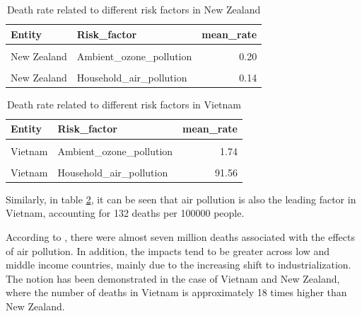 \documentclass[11pt,a4paper,]{article}
\begin{document}
\begin{table}[!h]

\caption{\label{tab:nz}Death rate related to different risk factors in New Zealand}
\centering
\begin{tabular}[t]{llr}
\toprule
Entity & Risk\_factor & mean\_rate\\
\midrule
\cellcolor{gray!6}{New Zealand} & \cellcolor{gray!6}{Air\_pollution} & \cellcolor{gray!6}{7.11}\\
New Zealand & Ambient\_ozone\_pollution & 0.20\\
\cellcolor{gray!6}{New Zealand} & \cellcolor{gray!6}{Ambient\_particulate\_matter\_pollution} & \cellcolor{gray!6}{6.77}\\
New Zealand & Household\_air\_pollution & 0.14\\
\bottomrule
\end{tabular}
\end{table}

\begin{table}[!h]

\caption{\label{tab:vn}Death rate related to different risk factors in Vietnam}
\centering
\begin{tabular}[t]{llr}
\toprule
Entity & Risk\_factor & mean\_rate\\
\midrule
\cellcolor{gray!6}{Vietnam} & \cellcolor{gray!6}{Air\_pollution} & \cellcolor{gray!6}{131.61}\\
Vietnam & Ambient\_ozone\_pollution & 1.74\\
\cellcolor{gray!6}{Vietnam} & \cellcolor{gray!6}{Ambient\_particulate\_matter\_pollution} & \cellcolor{gray!6}{38.99}\\
Vietnam & Household\_air\_pollution & 91.56\\
\bottomrule
\end{tabular}
\end{table}

Similarly, in table \ref{tab:vn}, it can be seen that air pollution is also the leading factor in Vietnam, accounting for 132 deaths per 100000 people.

According to \textcite{mannucci2017health}, there were almost seven million deaths associated with the effects of air pollution. In addition, the impacts tend to be greater across low and middle income countries, mainly due to the increasing shift to industrialization. The notion has been demonstrated in the case of Vietnam and New Zealand, where the number of deaths in Vietnam is approximately 18 times higher than New Zealand.
\end{document}
